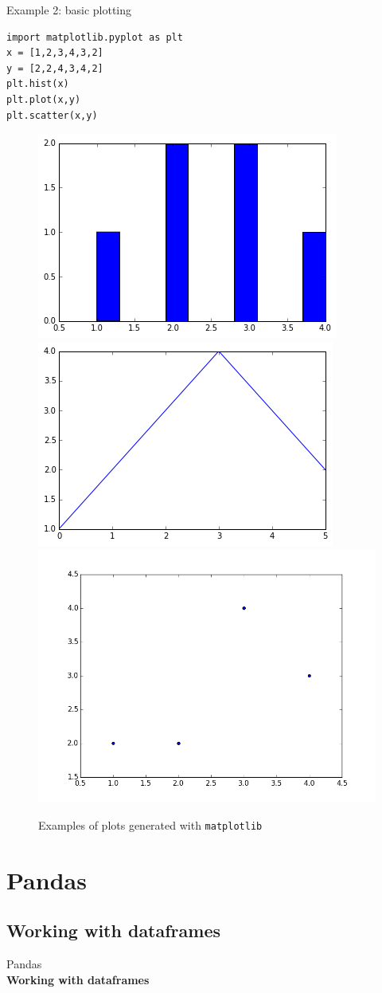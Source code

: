 \documentclass{beamer}
\begin{document}
\begin{frame}[fragile]{Example 2: basic plotting}
\begin{lstlisting}
import matplotlib.pyplot as plt
x = [1,2,3,4,3,2]
y = [2,2,4,3,4,2]
plt.hist(x)
plt.plot(x,y)
plt.scatter(x,y)
\end{lstlisting}


\begin{figure}[h]
	\centering
	\includegraphics[width=.3\linewidth]{../../pictures/plthist}\hfill
	\includegraphics[width=.3\linewidth]{../../pictures/pltplot}\hfill
	\includegraphics[width=.3\linewidth]{../../pictures/pltscatter}
	\caption{\label{fig:matplotlib}Examples of plots generated with \texttt{matplotlib}}
\end{figure}

\end{frame}





\section{Pandas}
\subsection{Working with dataframes}

\begin{frame}[plain]
	Pandas\\
	\textbf{Working with dataframes}
\end{frame}
\end{document}
